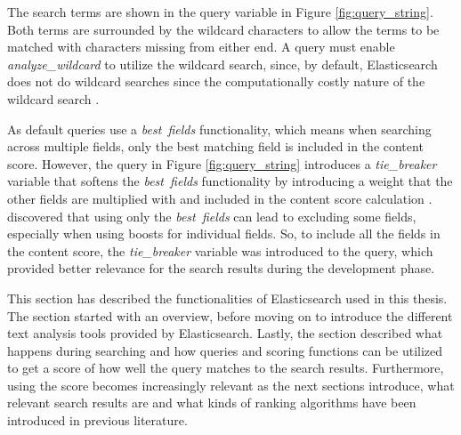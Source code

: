 The search terms are shown in the query variable in Figure \ref{fig:query_string}.
Both terms are surrounded by the wildcard characters to allow the terms to be matched with
characters missing from either end.
A query must enable \emph{analyze\_wildcard} to utilize the wildcard search, since, by default,
Elasticsearch does not do wildcard searches \cite{elasticIntro} since the computationally costly nature
of the wildcard search \cite{relevantSearch}.



As default queries use a \emph{best\ fields} functionality, which means when searching across multiple fields,
only the best matching field is included in the content score.
However, the query in Figure \ref{fig:query_string} introduces a \emph{tie\_breaker} variable 
that softens the \emph{best\ fields} functionality by introducing a weight 
that the other fields are multiplied with and included in the content score calculation 
\cite{relevantSearch}.
\citeauthor{relevantSearch} \cite{relevantSearch} discovered that using only the \emph{best\ fields} can
lead to excluding some fields, especially when using boosts for individual fields.
So, to include all the fields in the content score, the \emph{tie\_breaker} variable was introduced to the query, 
which provided better relevance for the search results during the development phase.



This section has described the functionalities of Elasticsearch used in this thesis.
The section started with an overview, before moving on to introduce the different text analysis
tools provided by Elasticsearch.
Lastly, the section described what happens during searching and how queries and scoring functions can be
utilized to get a score of how well the query matches to the search results.
Furthermore, using the score becomes increasingly relevant as the next sections introduce,
what relevant search results are and what kinds of ranking algorithms have been introduced in previous literature.



